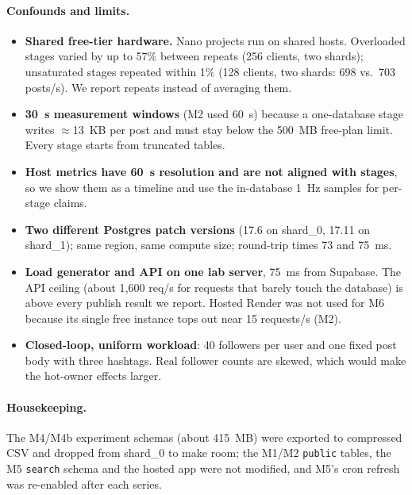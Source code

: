 \paragraph{Confounds and limits.}
\begin{itemize}[nosep,leftmargin=1.2em]
\item \textbf{Shared free-tier hardware.} Nano projects run on shared hosts. Overloaded stages varied by up to 57\%
      between repeats (256 clients, two shards); unsaturated stages repeated within 1\% (128 clients, two shards:
      698 vs.\ 703 posts/s). We report repeats instead of averaging them.
\item \textbf{30~s measurement windows} (M2 used 60~s) because a one-database stage writes $\approx$13~KB per post and
      must stay below the 500~MB free-plan limit. Every stage starts from truncated tables.
\item \textbf{Host metrics have 60~s resolution and are not aligned with stages}, so we show them as a timeline and use
      the in-database 1~Hz samples for per-stage claims.
\item \textbf{Two different Postgres patch versions} (17.6 on shard\_0, 17.11 on shard\_1); same region, same compute size;
      round-trip times 73 and 75~ms.
\item \textbf{Load generator and API on one lab server}, 75~ms from Supabase. The API ceiling (about 1{,}600 req/s for
      requests that barely touch the database) is above every publish result we report. Hosted Render was not used
      for M6 because its single free instance tops out near 15 requests/s (M2).
\item \textbf{Closed-loop, uniform workload}: 40 followers per user and one fixed post body with three hashtags. Real
      follower counts are skewed, which would make the hot-owner effects larger.
\end{itemize}

\paragraph{Housekeeping.} The M4/M4b experiment schemas (about 415~MB) were exported to compressed CSV and dropped
from shard\_0 to make room; the M1/M2 \texttt{public} tables, the M5 \texttt{search} schema and the hosted app were
not modified, and M5's cron refresh was re-enabled after each series.
